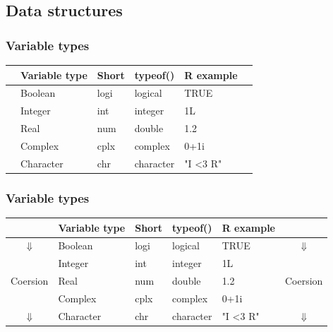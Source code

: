 \documentclass{beamer}
\begin{document}
\subsection{Data structures}

\begin{frame}
\frametitle{Variable types}
\begin{table}
\begin{tabular}{l l l l l l}
\toprule
&\textbf{Variable type}&\textbf{Short}&\textbf{typeof()}&\textbf{R example}&\\
\midrule
&Boolean & logi & logical & TRUE &\\
&Integer & int & integer & 1L &\\
&Real & num & double & 1.2 &\\
&Complex & cplx & complex & 0+1i &\\
&Character & chr & character & "I \textless3 R" &\\
\bottomrule
\end{tabular}
\end{table}
\end{frame}


\begin{frame}
	\frametitle{Variable types}
	\begin{table}
		\begin{tabular}{c l l l l c}
			\toprule
			&\textbf{Variable type}&\textbf{Short}&\textbf{typeof()}&\textbf{R 
			example}&\\
			\midrule
			$\Downarrow$ & Boolean & logi & logical & TRUE & $\Downarrow$\\
			 & Integer & int & integer & 1L &\\
			Coersion& Real & num & double & 1.2 & Coersion\\
			&Complex & cplx & complex & 0+1i &\\
			$\Downarrow$&Character & chr & character & "I \textless3 R" & 
			$\Downarrow$\\
			\bottomrule
		\end{tabular}
	\end{table}
\end{frame}
\end{document}
